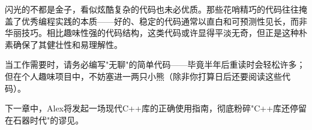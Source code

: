 闪光的不都是金子，看似炫酷复杂的代码也未必优质。那些花哨精巧的代码往往掩盖了优秀编程实践的本质——好的、稳定的代码通常以直白和可预测性见长，而非华丽技巧。相比趣味性强的代码结构，这类代码或许显得平淡无奇，但正是这种朴素确保了其健壮性和易理解性。

当工作需要时，请务必编写"无聊"的简单代码——毕竟半年后重读时会轻松许多；但在个人趣味项目中，不妨塞进一两只小熊（除非你打算日后还要阅读这些代码）。

下一章中，Alex将发起一场现代C++库的正确使用指南，彻底粉碎"C++库还停留在石器时代"的谬见。